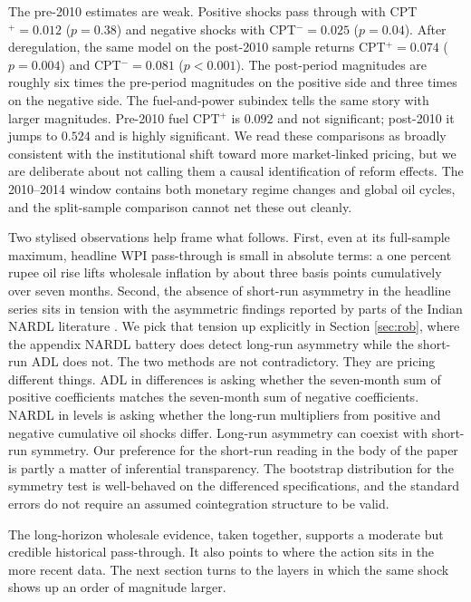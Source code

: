 \documentclass[11pt,a4paper]{article}
\begin{document}
The pre-2010 estimates are weak. Positive shocks pass through with CPT$^+ = 0.012$ ($p = 0.38$) and negative shocks with CPT$^- = 0.025$ ($p = 0.04$). After deregulation, the same model on the post-2010 sample returns CPT$^+ = 0.074$ ($p = 0.004$) and CPT$^- = 0.081$ ($p < 0.001$). The post-period magnitudes are roughly six times the pre-period magnitudes on the positive side and three times on the negative side. The fuel-and-power subindex tells the same story with larger magnitudes. Pre-2010 fuel CPT$^+$ is $0.092$ and not significant; post-2010 it jumps to $0.524$ and is highly significant. We read these comparisons as broadly consistent with the institutional shift toward more market-linked pricing, but we are deliberate about not calling them a causal identification of reform effects. The 2010--2014 window contains both monetary regime changes and global oil cycles, and the split-sample comparison cannot net these out cleanly.

Two stylised observations help frame what follows. First, even at its full-sample maximum, headline WPI pass-through is small in absolute terms: a one percent rupee oil rise lifts wholesale inflation by about three basis points cumulatively over seven months. Second, the absence of short-run asymmetry in the headline series sits in tension with the asymmetric findings reported by parts of the Indian NARDL literature \citep{abubakar2018,suresh2026}. We pick that tension up explicitly in Section \ref{sec:rob}, where the appendix NARDL battery does detect long-run asymmetry while the short-run ADL does not. The two methods are not contradictory. They are pricing different things. ADL in differences is asking whether the seven-month sum of positive coefficients matches the seven-month sum of negative coefficients. NARDL in levels is asking whether the long-run multipliers from positive and negative cumulative oil shocks differ. Long-run asymmetry can coexist with short-run symmetry. Our preference for the short-run reading in the body of the paper is partly a matter of inferential transparency. The bootstrap distribution for the symmetry test is well-behaved on the differenced specifications, and the standard errors do not require an assumed cointegration structure to be valid.

The long-horizon wholesale evidence, taken together, supports a moderate but credible historical pass-through. It also points to where the action sits in the more recent data. The next section turns to the layers in which the same shock shows up an order of magnitude larger.
\end{document}
